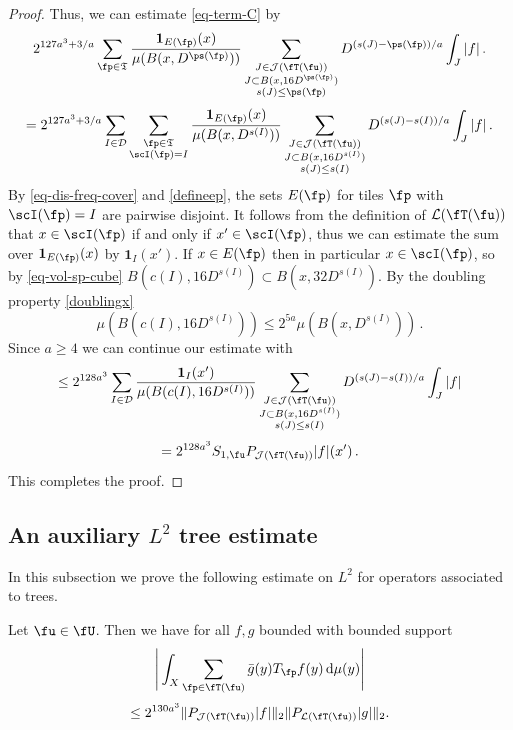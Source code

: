 \begin{proof}
    Thus, we can estimate \eqref{eq-term-C} by
    $$
        2^{127a^3 + 3/a}\sum_{\fp\in \mathfrak{T}}\frac{\mathbf{1}_{E(\fp)}(x)}{\mu(B(x,D^{\ps(\fp)}))}\sum_{\substack{J\in \mathcal{J}(\fT(\fu))\\J\subset B(x, 16D^{\ps(\fp)})\\ s(J) \le \ps(\fp)}} D^{(s(J) - \ps(\fp))/a} \int_J |f|\,.
    $$
    $$
        = 2^{127a^3 + 3/a}\sum_{I \in \mathcal{D}} \sum_{\substack{\fp\in \mathfrak{T}\\ \scI(\fp) = I}}\frac{\mathbf{1}_{E(\fp)}(x)}{\mu(B(x, D^{s(I)}))}\sum_{\substack{J\in \mathcal{J}(\fT(\fu))\\J\subset B(x, 16 D^{s(I)})\\ s(J) \le s(I)}} D^{(s(J) - s(I))/a} \int_J |f|\,.
    $$
    By \eqref{eq-dis-freq-cover} and \eqref{defineep}, the sets $E(\fp)$ for tiles $\fp$ with $\scI(\fp) = I$ are pairwise disjoint. It follows from the definition of $\mathcal{L}(\fT(\fu))$ that $x \in \scI(\fp)$ if and only if $x' \in \scI(\fp)$, thus we can estimate the sum over $\mathbf{1}_{E(\fp)}(x)$ by $\mathbf{1}_{I}(x')$.
    If $x \in E(\fp)$ then in particular $x \in \scI(\fp)$, so by \eqref{eq-vol-sp-cube} $B(c(I),16D^{s(I)}) \subset B(x, 32D^{s(I)})$. By the doubling property \eqref{doublingx}
    $$
        \mu(B(c(I), 16D^{s(I)})) \le 2^{5a} \mu(B(x, D^{s(I)}))\,.
    $$
    Since $a \ge 4$ we can continue our estimate with
    $$
        \le 2^{128a^3}\sum_{I \in \mathcal{D}} \frac{\mathbf{1}_{I}(x')}{\mu(B(c(I), 16D^{s(I)}))}\sum_{\substack{J\in \mathcal{J}(\fT(\fu))\\J\subset B(x, 16 D^{s(I)})\\ s(J) \le s(I)}} D^{(s(J) - s(I))/a} \int_J |f|
    $$
    $$
         = 2^{128a^3} S_{1,\fu} P_{\mathcal{J}(\fT(\fu))}|f|(x')\,.
    $$
    This completes the proof.
\end{proof}

\subsection{An auxiliary \texorpdfstring{$L^2$}{L2} tree estimate}

In this subsection we prove the following estimate on $L^2$ for operators associated to trees.

\begin{lemma}
    \label{tree-projection-estimate}
    \leanok
    Let $\fu \in \fU$.
    Then we have for all $f, g$ bounded with bounded support
    $$
        \Bigg|\int_X \sum_{\fp \in \fT(\fu)} \bar g(y) T_{\fp}f(y) \, \mathrm{d}\mu(y) \Bigg|
    $$
    \begin{equation}
        \label{eq-tree-est}
         \le 2^{130a^3}\|P_{\mathcal{J}(\fT(\fu))}|f|\|_{2}\|P_{\mathcal{L}(\fT(\fu))}|g|\|_{2}.
    \end{equation}
\end{lemma}

